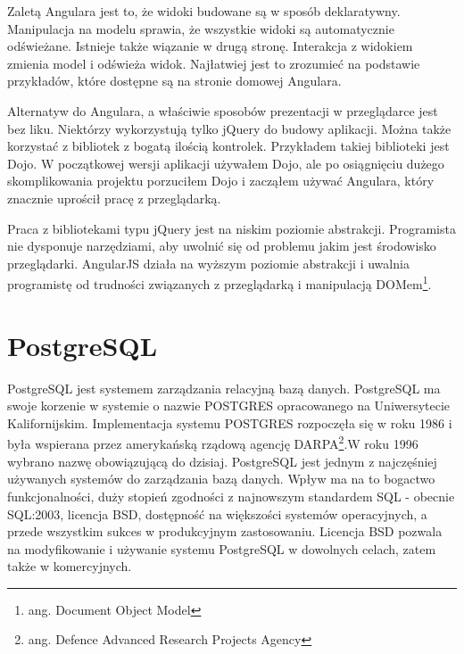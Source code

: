 \documentclass[a4paper,onecolumn,oneside,11pt,wide,floatssmall]{mwrep}
\theoremstyle{definition}
\theoremstyle{plain}%
\theoremstyle{remark}
\begin{document}
Zaletą Angulara jest to, że widoki budowane są w sposób deklaratywny. Manipulacja na modelu sprawia, że wszystkie widoki są automatycznie odświeżane. Istnieje także wiązanie w drugą stronę. Interakcja z widokiem zmienia model i odświeża widok. Najłatwiej jest to zrozumieć na podstawie przykładów, które dostępne są na stronie domowej Angulara.

Alternatyw do Angulara, a właściwie sposobów prezentacji w przeglądarce jest bez liku. Niektórzy wykorzystują tylko jQuery \cite{jqueryHome} do budowy aplikacji. Można także korzystać z bibliotek z bogatą ilością kontrolek. Przykładem takiej biblioteki jest Dojo. W początkowej wersji aplikacji używałem Dojo, ale po osiągnięciu dużego skomplikowania projektu porzuciłem Dojo i zacząłem używać Angulara, który znacznie uprościł pracę z przeglądarką.

Praca z bibliotekami typu jQuery jest na niskim poziomie abstrakcji. Programista nie dysponuje narzędziami, aby uwolnić się od problemu jakim jest środowisko przeglądarki. AngularJS działa na wyższym poziomie abstrakcji i uwalnia programistę od trudności związanych z przeglądarką i manipulacją DOMem\footnote{ang. Document Object Model}.

\section{PostgreSQL}
PostgreSQL \cite{postgreSQLHome} jest systemem zarządzania relacyjną bazą danych. PostgreSQL ma swoje korzenie w systemie o nazwie POSTGRES opracowanego na Uniwersytecie Kalifornijskim. Implementacja systemu POSTGRES rozpoczęła się w roku 1986 i była wspierana przez amerykańską rządową agencję DARPA\footnote{ang. Defence Advanced Research Projects Agency}.W roku 1996 wybrano nazwę obowiązującą do dzisiaj. PostgreSQL jest jednym z najczęśniej używanych systemów do zarządzania bazą danych. Wpływ ma na to bogactwo funkcjonalności, duży stopień zgodności z najnowszym standardem SQL - obecnie SQL:2003, licencja BSD, dostępność na większości systemów operacyjnych, a przede wszystkim sukces w produkcyjnym zastosowaniu. Licencja BSD pozwala na modyfikowanie i używanie systemu PostgreSQL w dowolnych celach, zatem także w komercyjnych.
\end{document}
